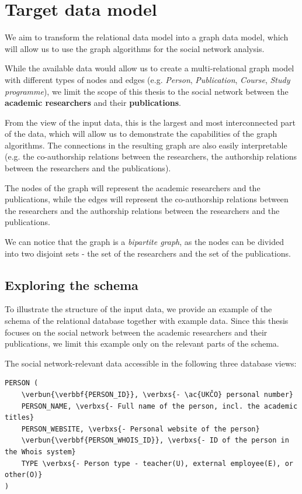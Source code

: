 \section{Target data model}\label{sec:target-data-model}

We aim to transform the relational data model into a graph data model, which will allow us to use the graph algorithms for the social network analysis.

While the available data would allow us to create a multi-relational graph model with different types of nodes and edges (e.g. \textit{Person}, \textit{Publication}, \textit{Course}, \textit{Study programme}), 
we limit the scope of this thesis to the social network between the \textbf{academic researchers} and their \textbf{publications}.

From the view of the input data, this is the largest and most interconnected part of the data, which will allow us to demonstrate the capabilities of the graph algorithms.
The connections in the resulting graph are also easily interpretable (e.g. the co-authorship relations between the researchers, the authorship relations between the researchers and the publications).

The nodes of the graph will represent the academic researchers and the publications, while the edges will represent the co-authorship relations between the researchers and the authorship relations between the researchers and the publications.

We can notice that the graph is a \textit{bipartite graph}, as the nodes can be divided into two disjoint sets - the set of the researchers and the set of the publications.

\subsection{Exploring the schema}

To illustrate the structure of the input data, we provide an example of the schema of the relational database together with example data.
Since this thesis focuses on the social network between the academic researchers and their publications, we limit this example only on the relevant parts of the schema.

The social network-relevant data accessible in the following three database views:

\begin{Verbatim}[commandchars=\\\{\}]
PERSON (
    \verbun{\verbbf{PERSON_ID}}, \verbxs{- \ac{UKČO} personal number}
    PERSON_NAME, \verbxs{- Full name of the person, incl. the academic titles}
    PERSON_WEBSITE, \verbxs{- Personal website of the person}
    \verbun{\verbbf{PERSON_WHOIS_ID}}, \verbxs{- ID of the person in the Whois system}
    TYPE \verbxs{- Person type - teacher(U), external employee(E), or other(O)}
)
\end{Verbatim}

